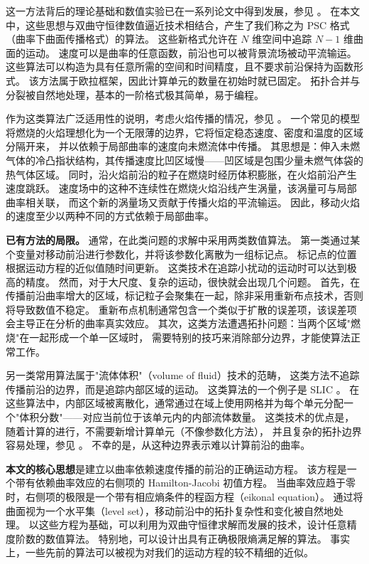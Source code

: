 \documentclass[11pt,a4paper]{article}
\begin{document}
这一方法背后的理论基础和数值实验已在一系列论文中得到发展，参见 \cite{sethian1982, sethian1985, sethian1987a, sethian1987b}。
在本文中，这些思想与双曲守恒律数值逼近技术相结合，产生了我们称之为 PSC 格式（曲率下曲面传播格式）的算法。
这些新格式允许在 $N$ 维空间中追踪 $N-1$ 维曲面的运动。
速度可以是曲率的任意函数，前沿也可以被背景流场被动平流输运。
这些算法可以构造为具有任意所需的空间和时间精度，且不要求前沿保持为函数形式。
该方法属于欧拉框架，因此计算单元的数量在初始时就已固定。
拓扑合并与分裂被自然地处理，基本的一阶格式极其简单，易于编程。

作为这类算法广泛适用性的说明，考虑火焰传播的情况，参见 \cite{sethian1987b}。
一个常见的模型将燃烧的火焰理想化为一个无限薄的边界，它将恒定稳态速度、密度和温度的区域分隔开来，
并以依赖于局部曲率的速度向未燃流体中传播。
其思想是：伸入未燃气体的冷凸指状结构，其传播速度比凹区域慢——凹区域是包围少量未燃气体袋的热气体区域。
同时，沿火焰前沿的粒子在燃烧时经历体积膨胀，在火焰前沿产生速度跳跃。
速度场中的这种不连续性在燃烧火焰沿线产生涡量，该涡量可与局部曲率相关联，
而这个新的涡量场又贡献于传播火焰的平流输运。
因此，移动火焰的速度至少以两种不同的方式依赖于局部曲率。

\medskip
\textbf{已有方法的局限。}
通常，在此类问题的求解中采用两类数值算法。
第一类通过某个变量对移动前沿进行参数化，并将该参数化离散为一组标记点。
标记点的位置根据运动方程的近似值随时间更新。
这类技术在追踪小扰动的运动时可以达到极高的精度。
然而，对于大尺度、复杂的运动，很快就会出现几个问题。
首先，在传播前沿曲率增大的区域，标记粒子会聚集在一起，除非采用重新布点技术，否则将导致数值不稳定。
重新布点机制通常包含一个类似于扩散的误差项，该误差项会主导正在分析的曲率真实效应。
其次，这类方法遭遇拓扑问题：当两个区域"燃烧"在一起形成一个单一区域时，
需要特别的技巧来消除部分边界，才能使算法正常工作。

另一类常用算法属于"流体体积"（volume of fluid）技术的范畴，
这类方法不追踪传播前沿的边界，而是追踪内部区域的运动。
这类算法的一个例子是 SLIC \cite{noh1976}。
在这些算法中，内部区域被离散化，通常通过在域上使用网格并为每个单元分配一个"体积分数"——对应当前位于该单元内的内部流体数量。
这类技术的优点是，随着计算的进行，不需要新增计算单元（不像参数化方法），
并且复杂的拓扑边界容易处理，参见 \cite{chorin1980, sethian1982}。
不幸的是，从这种边界表示难以计算前沿的曲率。

\medskip
\textbf{本文的核心思想}是建立以曲率依赖速度传播的前沿的正确运动方程。
该方程是一个带有依赖曲率效应的右侧项的 Hamilton-Jacobi 初值方程。
当曲率效应趋于零时，右侧项的极限是一个带有相应熵条件的程函方程（eikonal equation）。
通过将曲面视为一个水平集（level set），移动前沿中的拓扑复杂性和变化被自然地处理。
以这些方程为基础，可以利用为双曲守恒律求解而发展的技术，设计任意精度阶数的数值算法。
特别地，可以设计出具有正确极限熵满足解的算法。
事实上，一些先前的算法可以被视为对我们的运动方程的较不精细的近似。
\end{document}

